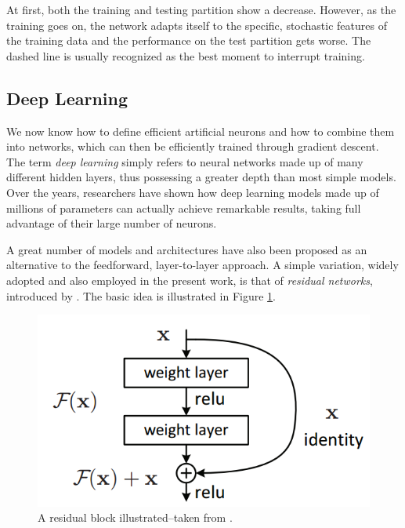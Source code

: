 At first, both the training and testing partition show a decrease. However, as the training goes on, the network adapts itself to the specific, stochastic features of the training data and the performance on the test partition gets worse. The dashed line is usually recognized as the best moment to interrupt training. 

\subsection{Deep Learning}
We now know how to define efficient artificial neurons and how to combine them into networks, which can then be efficiently trained through gradient descent. 
The term \emph{deep learning} simply refers to neural networks made up of many different hidden layers, thus possessing a greater depth than most simple models. Over the years, researchers have shown how deep learning models made up of millions of parameters can actually achieve remarkable results, taking full advantage of their large number of neurons.

A great number of models and architectures have also been proposed as an alternative to the feedforward, layer-to-layer approach. A simple variation, widely adopted and also employed in the present work, is that of \emph{residual networks}, introduced by \cite{DBLP:journals/corr/HeZRS15}. The basic idea is illustrated in Figure \ref{fig:resnet}.

\begin{figure}
    \centering
    \includegraphics[width=\columnwidth]{gfx/ch3/residual.png}
    \caption[A residual block]{A residual block illustrated--taken from \cite{DBLP:journals/corr/HeZRS15}.}
    \label{fig:resnet}
\end{figure}

